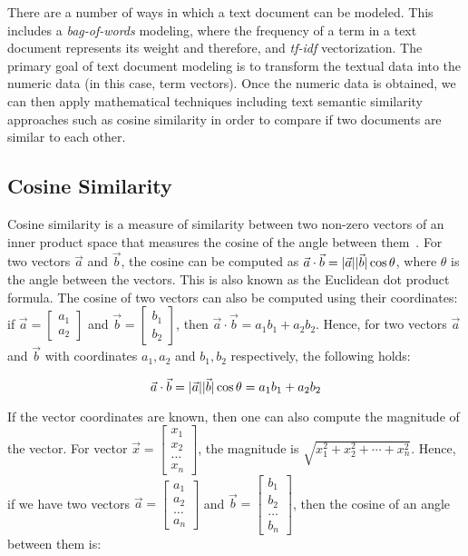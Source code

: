 \documentclass[11pt]{article}
\DeclarePairedDelimiter\abs{\lvert}{\rvert}
\begin{document}
There are a number of ways in which a text document can be modeled. This
includes a \textit{bag-of-words} modeling, where the frequency of a term in a
text document represents its weight and therefore, and \textit{tf-idf}
vectorization. The primary goal of text document modeling is to transform the
textual data into the numeric data (in this case, term vectors). Once the
numeric data is obtained, we can then apply mathematical techniques including
text semantic similarity approaches such as cosine similarity in order to
compare if two documents are similar to each other.

\subsection{Cosine Similarity}

Cosine similarity is a measure of similarity between two non-zero vectors of an
inner product space that measures the cosine of the angle between
them~\cite{wikicosine}. For two vectors \(\vec{a}\) and \(\vec{b}\),
the cosine can be computed as
\(\vec{a} \cdot \vec{b} = \abs{\vec{a}}\abs{\vec{b}}\cos\theta\),
where \(\theta\) is the angle between the vectors. This is also known as the
Euclidean dot product formula.
The cosine of two vectors can also be computed using their coordinates:
if \(\vec{a} = \begin{bmatrix}a_1 \\ a_2\end{bmatrix}\) and
\(\vec{b} = \begin{bmatrix}b_1 \\ b_2\end{bmatrix}\), then
\(\vec{a} \cdot \vec{b} = a_1b_1 + a_2b_2\). Hence, for two vectors \(\vec{a}\)
and \(\vec{b}\) with coordinates \(a_1, a_2\) and \(b_1, b_2\) respectively,
the following holds:

\[\vec{a} \cdot \vec{b} = \abs{\vec{a}}\abs{\vec{b}}\cos\theta = a_1b_1 + a_2b_2\]

\bigskip

If the vector coordinates are known, then one can also compute the magnitude of
the vector. For vector
\(\vec{x} = \begin{bmatrix}x_1 \\ x_2 \\ \dots \\ x_n\end{bmatrix}\),
the magnitude is \(\sqrt{x_1^2 + x_2^2 + \cdots + x_n^2}\). Hence, if we have two
vectors \(\vec{a} = \begin{bmatrix}a_1 \\ a_2 \\ \dots \\ a_n\end{bmatrix}\) and
\(\vec{b} = \begin{bmatrix}b_1 \\ b_2 \\ \dots \\ b_n\end{bmatrix}\), then the
cosine of an angle between them is:
\end{document}
